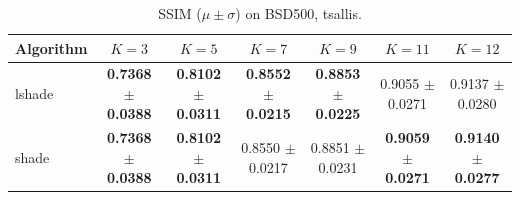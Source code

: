 \begin{table}[htbp]
\centering
\caption{SSIM ($\mu \pm \sigma$) on BSD500, tsallis.}
\label{tab:exp1-tsallis-ssim}
\begin{tabular}{lcccccc}
\toprule
Algorithm & $K=3$ & $K=5$ & $K=7$ & $K=9$ & $K=11$ & $K=12$ \\
\midrule
lshade & \textbf{0.7368 $\pm$ 0.0388} & \textbf{0.8102 $\pm$ 0.0311} & \textbf{0.8552 $\pm$ 0.0215} & \textbf{0.8853 $\pm$ 0.0225} & 0.9055 $\pm$ 0.0271 & 0.9137 $\pm$ 0.0280 \\
shade & \textbf{0.7368 $\pm$ 0.0388} & \textbf{0.8102 $\pm$ 0.0311} & 0.8550 $\pm$ 0.0217 & 0.8851 $\pm$ 0.0231 & \textbf{0.9059 $\pm$ 0.0271} & \textbf{0.9140 $\pm$ 0.0277} \\
\bottomrule
\end{tabular}
\end{table}